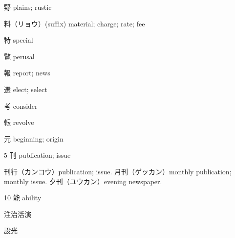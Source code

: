 野 plains; rustic

料（リョウ）(suffix) material; charge; rate; fee

特 special

覧 perusal

報 report; news

選 elect; select

考 consider

転 revolve

元 beginning; origin

5 刊 publication; issue

刊行（カンコウ）publication; issue.
月刊（ゲッカン）monthly publication; monthly issue.
夕刊（ユウカン）evening newspaper.

10 能 ability

注治活演

設光
